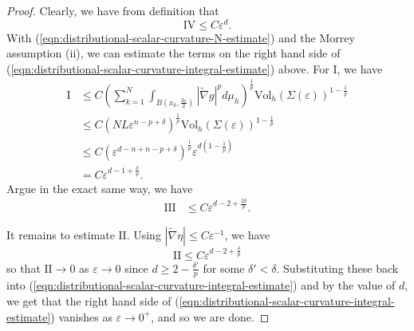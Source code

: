 \documentclass[12pt]{amsart}
\def\e{\varepsilon}
\theoremstyle{plain}
\theoremstyle{plain}
\theoremstyle{definition}
\theoremstyle{remark}
\numberwithin{equation}{subsection}
\newcommand{\hdel}{\tilde{\nabla}}
\begin{document}
\begin{proof}
Clearly, we have from definition that
 \begin{equation*}
        \text{IV} \leq C\varepsilon^d.
    \end{equation*}
    With (\ref{eqn:distributional-scalar-curvature-N-estimate}) and the Morrey assumption (ii), we can estimate the terms on the right hand side of (\ref{eqn:distributional-scalar-curvature-integral-estimate}) above. For I, we have
    \begin{align*}
        \text{I} &\leq C\left(\sum\limits_{k=1}^N \int_{B(x_k,\frac{3\varepsilon}{2})}|\hdel g|^pd\mu_h\right)^\frac{1}{p}\text{Vol}_h(\Sigma(\varepsilon))^{1-\frac{1}{p}} \nonumber \\
        &\leq C\left(NL\varepsilon^{n-p+\delta}\right)^\frac{1}{p}\text{Vol}_h(\Sigma(\varepsilon))^{1-\frac{1}{p}} \nonumber \\
        &\leq C(\varepsilon^{d-n+n-p+\delta})^\frac{1}{p}\varepsilon^{d\left(1-\frac{1}{p}\right)} \nonumber \\
        &= C\varepsilon^{d-1+\frac{\delta}{p}}.
    \end{align*} 
Argue in the exact same way, we have 
    \begin{align*}
        \text{III} &\leq C\varepsilon^{d-2+\frac{2\delta}{p}}.
    \end{align*}
    
%    

It remains to estimate $\text{II}$. Using $|\hdel \eta|\leq C\e^{-1}$, we have 
\begin{equation}
\text{II}\leq C\e^{d-2+\frac{\delta}{p}}
\end{equation}
so that $\text{II}\to0$ as $\e\to 0$ since $d\geq 2-\frac{\delta'}{p}$ for some $\delta'<\delta$.    Substituting these back into (\ref{eqn:distributional-scalar-curvature-integral-estimate}) and by the value of $d$, we get that the right hand side of (\ref{eqn:distributional-scalar-curvature-integral-estimate}) vanishes as $\varepsilon\to0^+$, and so we are done.
\end{proof}
\end{document}
